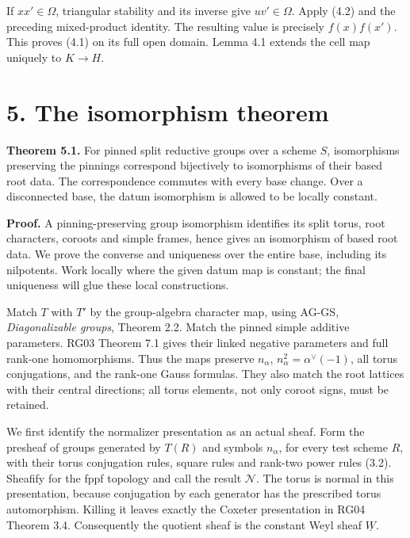 \documentclass[11pt,a4paper,openany]{report}
\begin{document}
If \(xx'\in\Omega\), triangular stability and its inverse give \(uv'\in\Omega\). Apply (4.2) and the preceding mixed-product identity. The resulting value is precisely \(f(x)f(x')\). This proves (4.1) on its full open domain. Lemma 4.1 extends the cell map uniquely to \(K\to H\).

\section{5. The isomorphism theorem}\label{AG-RG-05-the-isomorphism-theorem}

\textbf{Theorem 5.1.} For pinned split reductive groups over a scheme \(S\), isomorphisms preserving the pinnings correspond bijectively to isomorphisms of their based root data. The correspondence commutes with every base change. Over a disconnected base, the datum isomorphism is allowed to be locally constant.

\textbf{Proof.} A pinning-preserving group isomorphism identifies its split torus, root characters, coroots and simple frames, hence gives an isomorphism of based root data. We prove the converse and uniqueness over the entire base, including its nilpotents. Work locally where the given datum map is constant; the final uniqueness will glue these local constructions.

Match \(T\) with \(T'\) by the group-algebra character map, using AG-GS, \emph{Diagonalizable groups}, Theorem 2.2. Match the pinned simple additive parameters. RG03 Theorem 7.1 gives their linked negative parameters and full rank-one homomorphisms. Thus the maps preserve \(n_\alpha\), \(n_\alpha^2=\alpha^\vee(-1)\), all torus conjugations, and the rank-one Gauss formulas. They also match the root lattices with their central directions; all torus elements, not only coroot signs, must be retained.

We first identify the normalizer presentation as an actual sheaf. Form the presheaf of groups generated by \(T(R)\) and symbols \(n_\alpha\), for every test scheme \(R\), with their torus conjugation rules, square rules and rank-two power rules (3.2). Sheafify for the fppf topology and call the result \(\mathcal N\). The torus is normal in this presentation, because conjugation by each generator has the prescribed torus automorphism. Killing it leaves exactly the Coxeter presentation in RG04 Theorem 3.4. Consequently the quotient sheaf is the constant Weyl sheaf \(\underline W\).
\end{document}
